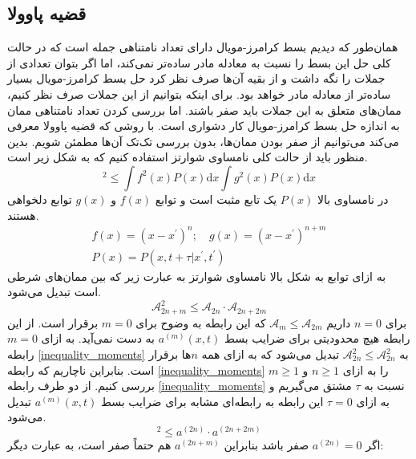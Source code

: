 \subsection{قضیه پاوولا}
همان‌طور که دیدیم بسط کرامرز-مویال دارای تعداد نامتناهی جمله است که در حالت کلی حل این بسط را نسبت به معادله مادر ساده‌تر نمی‌کند، اما اگر بتوان تعدادی از جملات را نگه داشت و از بقیه آن‌ها صرف نظر کرد حل بسط کرامرز-مویال بسیار ساده‌تر از معادله مادر خواهد بود. برای اینکه بتوانیم از این جملات صرف نظر کنیم، ممان‌های متعلق به این جملات باید صفر باشند. اما بررسی کردن تعداد نامتناهی ممان به اندازه حل بسط کرامرز-مویال کار دشواری است. با روشی که قضیه پاوولا معرفی می‌کند می‌توانیم از صفر بودن ممان‌ها، بدون بررسی تک‌تک آن‌ها مطمئن شویم. 
بدین منظور باید از حالت کلی نامساوی شوارتز استفاده کنیم که به شکل زیر است.
\begin{equation}
  [f(x) g(x) P(x) \mathrm{d} x]^{2} \leq \int f^{2}(x) P(x) \mathrm{d} x \int g^{2}(x) P(x) \mathrm{d} x
\end{equation}
در نامساوی بالا $P(x)$ یک تابع مثبت است و توابع $f(x)$ و $g(x)$ توابع دلخواهی هستند.
$$
\begin{array}{l}{f(x)=\left(x-x^{\prime}\right)^{n} ; \quad g(x)=\left(x-x^{\prime}\right)^{n+m}} \\ {P(x)=P\left(x, t+\tau | x^{\prime}, t^{\prime}\right)}\end{array}
$$
به ازای توابع به شکل بالا نامساوی شوارتز به عبارت زیر که بین ممان‌های شرطی است تبدیل می‌شود.\cite{risken_fokker-planck_1984}
\begin{equation}
  \mathcal{A}_{2 n+m}^{2} \leq \mathcal{A}_{2 n} \cdot \mathcal{A}_{2 n+2 m}
  \label{inequality_moments}
\end{equation}
برای $n=0$ داریم $\mathcal{A}_{m} \leq \mathcal{A}_{2m}$  که این رابطه به وضوح برای $m = 0$ برقرار است. از این رابطه هیچ محدودیتی برای ضرایب بسط $a^{(m)}(x, t)$ به دست نمی‌آید. به ازای $m = 0$ رابطه \ref{inequality_moments} به $\mathcal{A}^{2}_{2n} \leq \mathcal{A}^{2}_{2n}$ تبدیل می‌شود که به ازای همه $n$ها برقرار است. بنابراین ناچاریم که رابطه \ref{inequality_moments} را به ازای $n \geq 1$ و $m \geq 1$ بررسی کنیم. از دو طرف رابطه \ref{inequality_moments} نسبت به $\tau$ مشتق می‌گیریم و به ازای $\tau = 0$ این رابطه به رابطه‌ای مشابه برای ضرایب بسط $a^{(m)}(x, t)$ تبدیل می‌شود.
\begin{equation}
  [a^{(2 n+m)}]^{2} \leq a^{(2 n)} \cdot a^{(2 n+2 m)}
  \label{inequality_coeff}
\end{equation}
اگر $a^{(2 n)} = 0$ صفر باشد بنابراین $a^{(2 n + m)}$ هم حتماً صفر است، به عبارت دیگر:
